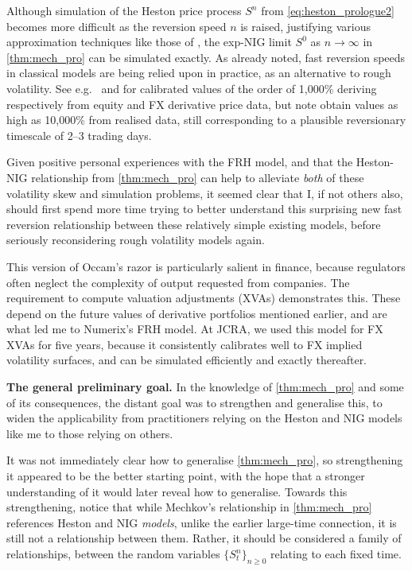 Although simulation of the Heston price process $S^n$ from \autoref{eq:heston_prologue2} becomes more difficult as the reversion speed $n$ is raised, justifying various approximation techniques like those of \cite{andersen_2008}, the exp-NIG limit $S^0$ as $n\to\infty$ in \autoref{thm:mech_pro} can be simulated exactly. As already noted, fast reversion speeds in classical models are being relied upon in practice, as an alternative to rough volatility. See e.g.~\cite{bergomi_2016} and \cite{decol_2013} for calibrated values of the order of 1,000\% deriving respectively from equity and FX derivative price data, but note \cite{fouque_2011} obtain values as high as 10,000\% from realised data, still corresponding to a plausible reversionary timescale of 2--3 trading days.

Given positive personal experiences with the FRH model, and that the Heston-NIG relationship from \autoref{thm:mech_pro} can help to alleviate \emph{both} of these volatility skew and simulation problems, it seemed clear that I, if not others also, should first spend more time trying to better understand this surprising new fast reversion relationship between these relatively simple existing models, before seriously reconsidering rough volatility models again.

This version of Occam's razor is particularly salient in finance, because regulators often neglect the complexity of output requested from companies. The requirement to compute valuation adjustments (XVAs) demonstrates this. These depend on the future values of derivative portfolios mentioned earlier, and are what led me to Numerix's FRH model. At JCRA, we used this model for FX XVAs for five years, because it consistently calibrates well to FX implied volatility surfaces, and can be simulated efficiently and exactly thereafter.

\vspace{3mm}\textbf{The general preliminary goal.} In the knowledge of \autoref{thm:mech_pro} and some of its consequences, the distant goal was to strengthen and generalise this, to widen the applicability from practitioners relying on the Heston and NIG models like me to those relying on others.

It was not immediately clear how to generalise \autoref{thm:mech_pro}, so strengthening it appeared to be the better starting point, with the hope that a stronger understanding of it would later reveal how to generalise. Towards this strengthening, notice that while Mechkov's relationship in \autoref{thm:mech_pro} references Heston and NIG \emph{models}, unlike the earlier large-time connection, it is still not a relationship between them. Rather, it should be considered a family of relationships, between the random variables $\{S^n_t\}_{n\ge0}$ relating to each fixed time.


